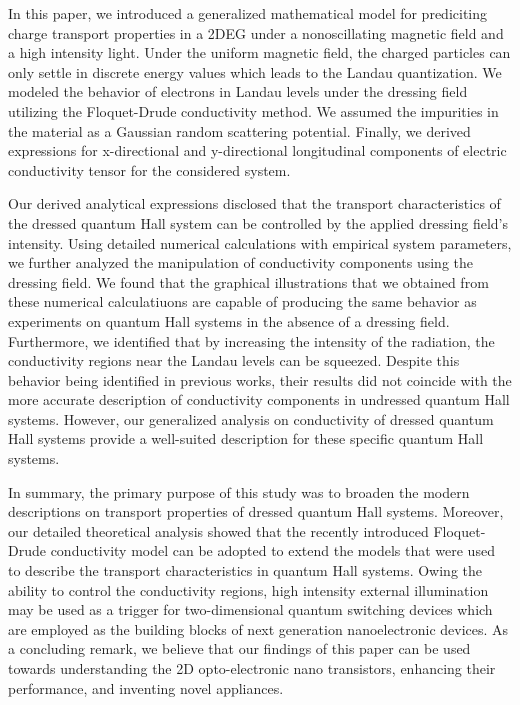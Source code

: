 In this paper, we introduced a generalized mathematical model for prediciting  charge transport properties in a 2DEG under a nonoscillating magnetic field and a high intensity light. Under the uniform magnetic field, the charged particles can only settle in discrete energy values which leads to the Landau quantization. We modeled the behavior of electrons in Landau levels under the dressing field utilizing the Floquet-Drude conductivity method. We assumed the impurities in the material as a Gaussian random scattering potential. Finally, we derived expressions for x-directional and y-directional longitudinal components of electric conductivity tensor for the considered system.

Our derived analytical expressions disclosed that the transport characteristics of the dressed quantum Hall system can be controlled by the applied dressing field’s intensity. Using detailed numerical calculations with empirical system parameters, we further analyzed the manipulation of conductivity components using the dressing field.
We found that the graphical illustrations that we obtained from these numerical calculatiuons are capable of producing the same behavior as experiments on quantum Hall systems in the absence of a dressing field.
Furthermore, we identified that by increasing the intensity of the radiation, the conductivity regions near the Landau levels can be squeezed. Despite this behavior being identified in previous works, their results did not coincide with the more accurate description of conductivity components in undressed quantum Hall systems. However, our generalized analysis on conductivity of dressed quantum Hall systems provide a well-suited description for these specific quantum Hall systems.

In summary, the primary purpose of this study was to broaden the modern descriptions on transport properties of dressed quantum Hall systems. Moreover, our detailed theoretical analysis showed that the recently introduced Floquet-Drude conductivity model can be adopted to extend the models that were used to describe the transport characteristics in quantum Hall systems. Owing the ability to control the conductivity regions, high intensity external illumination may be used as a trigger for two-dimensional quantum switching devices which are employed as the building blocks of next generation nanoelectronic devices. As a concluding remark, we believe that our findings of this paper can be used towards understanding the 2D opto-electronic nano transistors, enhancing their performance, and inventing novel appliances.
